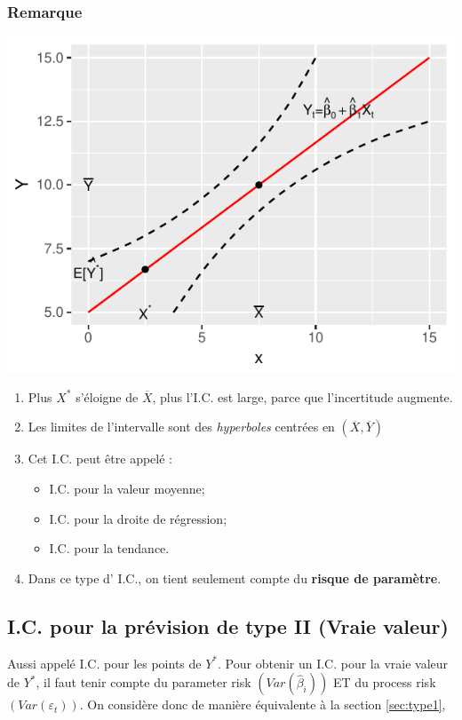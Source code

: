 \documentclass[11pt,french]{report}
\begin{document}
\subsubsection*{Remarque}

\includegraphics{notes_de_cours-020}

\begin{enumerate}
\item Plus $X^*$ s'éloigne de $\overline{X}$, plus l'I.C. est large, parce que l'incertitude augmente.
\item Les limites de l'intervalle sont des \emph{hyperboles} centrées en $(\overline{X}, \overline{Y})$
\item Cet I.C. peut être appelé :
     \begin{itemize}
     \item I.C. pour la valeur moyenne;
     \item I.C. pour la droite de régression;
     \item I.C. pour la tendance.
     \end{itemize}
\item Dans ce type d' I.C., on tient seulement compte du \textbf{risque de paramètre}.
\end{enumerate}

\subsection{I.C. pour la prévision de type II (Vraie valeur)}
\label{sec:type2}
Aussi appelé I.C. pour les points de $Y^*$.
\bigskip
Pour obtenir un I.C. pour la vraie valeur de $Y^*$, il faut tenir compte du parameter risk $(Var(\hat{\beta}_i))$ ET du process risk $(Var(\varepsilon_t))$. On considère donc de manière équivalente à la section \ref{sec:type1},
\end{document}
